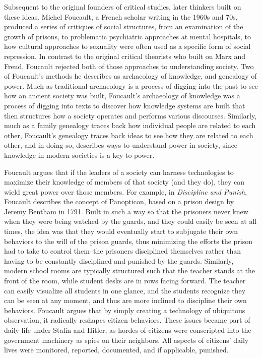\documentclass[sigconf]{acmart}
\begin{document}
Subsequent to the original founders of critical studies, later thinkers built on these ideas.  Michel Foucault, a French scholar writing in the 1960s and 70s, produced a series of critiques of social structures, from an examination of the growth of prisons, to problematic psychiatric approaches at mental hospitals, to how cultural approaches to sexuality were often used as a specific form of social repression.  In contrast to the original critical theorists who built on Marx and Freud, Foucault rejected both of those approaches to understanding society.  Two of Foucault's methods he describes as archaeology of knowledge, and genealogy of power. \cite{ritzer18,seidman16}  Much as traditional archaeology is a process of digging into the past to see how an ancient society was built, Foucault's archaeology of knowledge was a process of digging into texts to discover how knowledge systems are built that then structures how a society operates and performs various discourses.  Similarly, much as a family genealogy traces back how individual people are related to each other, Foucault's genealogy traces back ideas to see how they are related to each other, and in doing so, describes ways to understand power in society, since knowledge in modern societies is a key to power.  

Foucault argues that if the leaders of a society can harness technologies to maximize their knowledge of members of that society (and they do), they can wield great power over those members.  For example, in {\em Discipline and Punish}, Foucault describes the concept of Panopticon, based on a prison design by Jeremy Bentham in 1791. Built in such a way so that the prisoners never knew when they were being watched by the guards, and they could easily be seen at all times, the idea was that they would eventually start to subjugate their own behaviors to the will of the prison guards, thus minimizing the efforts the prison had to take to control them--the prisoners disciplined themselves rather than having to be constantly disciplined and punished by the guards. \cite{foucault77}  Similarly, modern school rooms are typically structured such that the teacher stands at the front of the room, while student desks are in rows facing forward.  The teacher can easily visualize all students in one glance, and the students recognize they can be seen at any moment, and thus are more inclined to discipline their own behaviors.  Foucault argues that by simply creating a technology of ubiquitous observation, it radically reshapes citizen behaviors.  These issues became part of daily life under Stalin and Hitler, as hordes of citizens were conscripted into the government machinery as spies on their neighbors.  All aspects of citizens' daily lives were monitored, reported, documented, and if applicable, punished.
\end{document}
